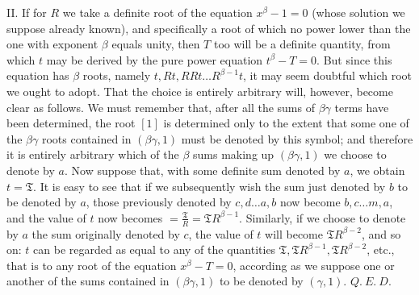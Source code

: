 II. If for \(R\) we take a definite root of the equation \(x^\beta-1=0\) (whose solution we suppose already known), and specifically a root of which no power lower than the one with exponent \(\beta\) equals unity, then \(T\) too will be a definite quantity, from which \(t\) may be derived by the pure power equation \(t^\beta-T=0\). But since this equation has \(\beta\) roots, namely \(t,\allowbreak Rt,\allowbreak RRt\ldots R^{\beta-1}t\), it may seem doubtful which root we ought to adopt. That the choice is entirely arbitrary will, however, become clear as follows. We must remember that, after all the sums of \(\beta\gamma\) terms have been determined, the root \([1]\) is determined only to the extent that some one of the \(\beta\gamma\) roots contained in \((\beta\gamma,1)\) must be denoted by this symbol; and therefore it is entirely arbitrary which of the \(\beta\) sums making up \((\beta\gamma,1)\) we choose to denote by \(a\). Now suppose that, with some definite sum denoted by \(a\), we obtain \(t=\mathfrak{T}\). It is easy to see that if we subsequently wish the sum just denoted by \(b\) to be denoted by \(a\), those previously denoted by \(c,\allowbreak d\ldots a,\allowbreak b\) now become \(b,\allowbreak c\ldots m,\allowbreak a\), and the value of \(t\) now becomes \(=\frac{\mathfrak{T}}R=\mathfrak{T}R^{\beta-1}\). Similarly, if we choose to denote by \(a\) the sum originally denoted by \(c\), the value of \(t\) will become \(\mathfrak{T}R^{\beta-2}\), and so on: \(t\) can be regarded as equal to any of the quantities \(\mathfrak{T},\allowbreak \mathfrak{T}R^{\beta-1},\allowbreak \mathfrak{T}R^{\beta-2}\), etc., \(\text{that is}\) to any root of the equation \(x^\beta-T=0\), according as we suppose one or another of the sums contained in \((\beta\gamma,1)\) to be denoted by \((\gamma,1)\). \(Q.\ E.\ D.\)

